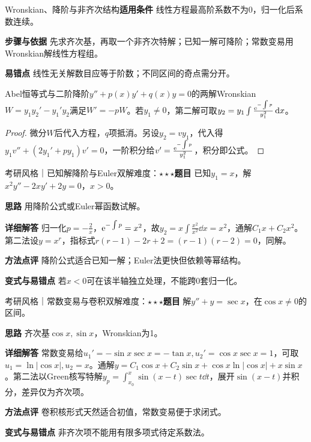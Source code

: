 \begin{method}{Wronskian、降阶与非齐次结构}\textbf{适用条件} 线性方程最高阶系数不为0，归一化后系数连续。\par\textbf{步骤与依据} 先求齐次基，再取一个非齐次特解；已知一解可降阶；常数变易用Wronskian解线性方程组。\par\textbf{易错点} 线性无关解数目应等于阶数；不同区间的奇点需分开。\end{method}

\begin{theorem}{Abel恒等式与二阶降阶}$y''+p(x)y'+q(x)y=0$的两解Wronskian$W=y_1y_2'-y_1'y_2$满足$W'=-pW$。若$y_1\ne0$，第二解可取$y_2=y_1\int\frac{\mathrm{e}^{-\int p}}{y_1^2}\mathop{}\!\mathrm{d} x$。\end{theorem}\begin{proof}微分$W$后代入方程，$q$项抵消。另设$y_2=vy_1$，代入得$y_1v''+(2y_1'+py_1)v'=0$，一阶积分给$v'=\frac{\mathrm{e}^{-\int p}}{y_1^2}$，积分即公式。\end{proof}

\begin{example}{考研风格｜已知解降阶与Euler双解}{难度：$\star\star\star$}\label{deep:ex:ode_source_deep:reduction}\textbf{题目} 已知$y_1=x$，解$x^2y''-2xy'+2y=0$，$x>0$。\par\textbf{思路} 用降阶公式或Euler幂函数试解。\par\textbf{详细解答} 归一化$p=-\frac{2}{x}$，$\mathrm{e}^{-\int p}=x^2$，故$y_2=x\int \frac{x^2}{x^2}\dd x=x^2$，通解$C_1x+C_2x^2$。第二法设$y=x^r$，指标式$r(r-1)-2r+2=(r-1)(r-2)=0$，同解。\par\textbf{方法点评} 降阶公式适合已知一解；Euler法更快但依赖等幂结构。\par\textbf{变式与易错点} 若$x<0$可在该半轴独立处理，不能跨0套归一化。\end{example}

\begin{example}{考研风格｜常数变易与卷积双解}{难度：$\star\star\star$}\label{deep:ex:ode_source_deep:variation}\textbf{题目} 解$y''+y=\sec x$，在$\cos x\ne0$的区间。\par\textbf{思路} 齐次基$\cos x,\sin x$，Wronskian为1。\par\textbf{详细解答} 常数变易给$u_1'=-\sin x\sec x=-\tan x,u_2'=\cos x\sec x=1$，可取$u_1=\ln|\cos x|,u_2=x$。通解$y=C_1\cos x+C_2\sin x+\cos x\ln|\cos x|+x\sin x$。第二法以Green核写特解$y_p=\int_{x_0}^x\sin(x-t)\sec t\dd t$，展开$\sin(x-t)$并积分，差异仅为齐次项。\par\textbf{方法点评} 卷积核形式天然适合初值，常数变易便于求闭式。\par\textbf{变式与易错点} 非齐次项不能用有限多项式待定系数法。\end{example}

